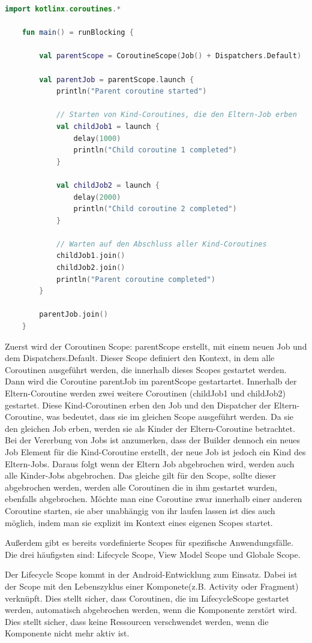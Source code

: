 \documentclass[fontsize=12pt,paper=a4,twoside=semi,parskip=half-,headsepline,headinclude]{scrreprt}
\begin{document}
\begin{lstlisting}[language=Kotlin]
	import kotlinx.coroutines.*

	fun main() = runBlocking {
	
    	val parentScope = CoroutineScope(Job() + Dispatchers.Default)

		val parentJob = parentScope.launch {
			println("Parent coroutine started")
			
			// Starten von Kind-Coroutines, die den Eltern-Job erben
			val childJob1 = launch {
				delay(1000)
				println("Child coroutine 1 completed")
			}
		
			val childJob2 = launch {
				delay(2000)
				println("Child coroutine 2 completed")
			}
		
			// Warten auf den Abschluss aller Kind-Coroutines
			childJob1.join()
			childJob2.join()
			println("Parent coroutine completed")
		}
	
		parentJob.join()
	}
\end{lstlisting}

Zuerst wird der Coroutinen Scope: parentScope erstellt, mit einem neuen Job und dem Dispatchers.Default. Dieser Scope definiert den Kontext, in dem alle Coroutinen ausgeführt werden, die innerhalb dieses Scopes gestartet werden. Dann wird die Coroutine parentJob im parentScope gestartartet. Innerhalb der Eltern-Coroutine werden zwei weitere Coroutinen (childJob1 und childJob2) gestartet. Diese Kind-Coroutinen erben den Job und den Dispatcher der Eltern-Coroutine, was bedeutet, dass sie im gleichen Scope ausgeführt werden. Da sie den gleichen Job erben, werden sie als Kinder der Eltern-Coroutine betrachtet. Bei der Vererbung von Jobs ist anzumerken, dass der Builder dennoch ein neues Job Element für die Kind-Coroutine erstellt, der neue Job ist jedoch ein Kind des Eltern-Jobs. Daraus folgt wenn der Eltern Job abgebrochen wird, werden auch alle Kinder-Jobs abgebrochen. Das gleiche gilt für den Scope, sollte dieser abgebrochen werden, werden alle Coroutinen die in ihm gestartet wurden, ebenfalls abgebrochen. Möchte man eine Coroutine zwar innerhalb einer anderen Coroutine starten, sie aber unabhängig von ihr laufen lassen ist dies auch möglich, indem man sie explizit im Kontext eines eigenen Scopes startet.

Außerdem gibt es bereits vordefinierte Scopes für spezifische Anwendungsfälle. Die drei häufigsten sind: Lifecycle Scope, View Model Scope und Globale Scope.

Der Lifecycle Scope kommt in der Android-Entwicklung zum Einsatz. Dabei ist der Scope mit den Lebenszyklus einer Komponete(z.B. Activity oder Fragment) verknüpft. Dies stellt sicher, dass Coroutinen, die im LifecycleScope gestartet werden, automatisch abgebrochen werden, wenn die Komponente zerstört wird. Dies stellt sicher, dass keine Ressourcen verschwendet werden, wenn die Komponente nicht mehr aktiv ist.
\end{document}

